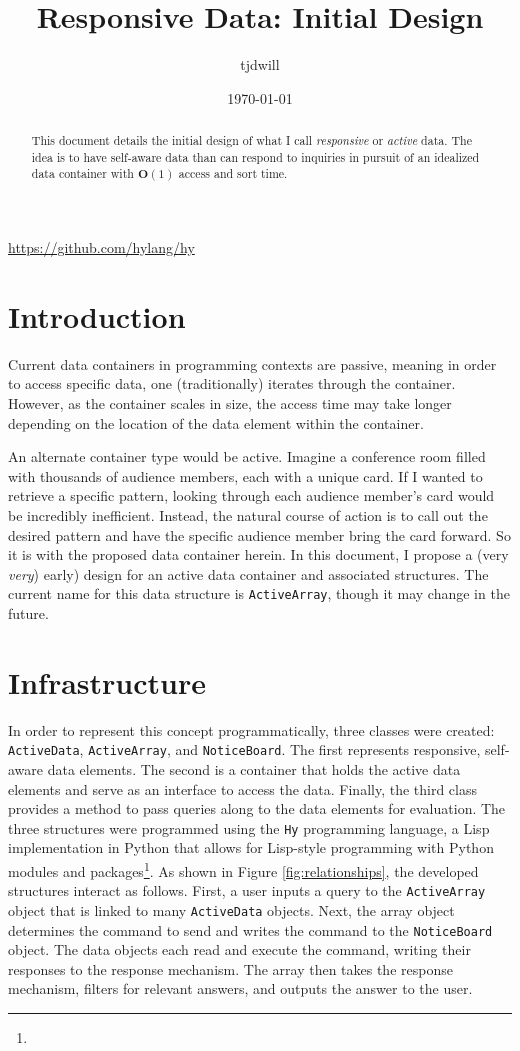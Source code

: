 \documentclass[10pt]{article}
\author{tjdwill}
\date{\today}
\title{Responsive Data: Initial Design}
\begin{document}
\maketitle

\urldef{\Hy}\url{https://github.com/hylang/hy}


\begin{abstract}
	This document details the initial design of what I call \textit{responsive} or \textit{active} data. The idea is to have self-aware data than can respond to inquiries in pursuit of an idealized data container with $\mathbf{O}(1)$ access and sort time.
\end{abstract}

\section{Introduction}
	Current data containers in programming contexts are passive, meaning in order to access specific data, one (traditionally) iterates through the container. However, as the container scales in size, the access time may take longer depending on the location of the data element within the container. 
	
	An alternate container type would be active. Imagine a conference room filled with thousands of audience members, each with a unique card. If I wanted to retrieve a specific pattern, looking through each audience member's card would be incredibly inefficient. Instead, the natural course of action is to call out the desired pattern and have the specific audience member bring the card forward. So it is with the proposed data container herein. In this document, I propose a (very \textit{very}) early) design for an active data container and associated structures. The current name for this data structure is \lstinline|ActiveArray|, though it may change in the future.
	
\section{Infrastructure}

	In order to represent this concept programmatically, three classes were created:  \lstinline|ActiveData|, \lstinline|ActiveArray|, and \lstinline|NoticeBoard|. The first represents responsive, self-aware data elements. The second is a container that holds the active data elements and serve as an interface to access the data. Finally, the third class provides a method to pass queries along to the data elements for evaluation. The three structures were programmed using the \texttt{Hy} programming language, a Lisp implementation in Python that allows for Lisp-style programming with Python modules and packages\footnote{\Hy}. As shown in Figure \ref{fig:relationships}, the developed structures interact as follows. First, a user inputs a query to the \lstinline|ActiveArray| object that is linked to many \lstinline|ActiveData| objects. Next, the array object determines the command to send and writes the command to the \lstinline|NoticeBoard| object. The data objects each read and execute the command, writing their responses to the response mechanism. The array then takes the response mechanism, filters for relevant answers, and outputs the answer to the user.
	
\end{document}
